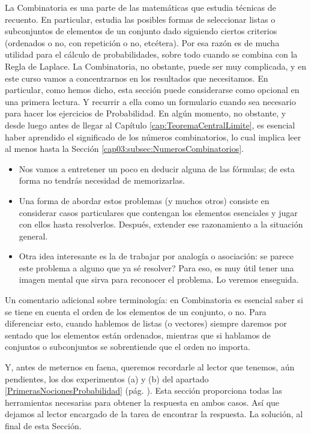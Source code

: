 La Combinatoria es una parte de las matemáticas que estudia técnicas de recuento. En particular, estudia las posibles formas de seleccionar listas o
subconjuntos de elementos de un conjunto dado siguiendo ciertos criterios (ordenados o no, con repetición o no, etcétera). Por esa razón es de mucha
utilidad para el cálculo de probabilidades, sobre todo cuando se combina con la Regla de Laplace. La Combinatoria, no obstante, puede ser muy
complicada, y en este curso vamos a concentrarnos en los resultados que necesitamos. En particular, como hemos dicho, esta sección puede considerarse como opcional en una primera lectura. Y recurrir a ella como un formulario cuando sea necesario para hacer los ejercicios de Probabilidad. En algún momento, no
obstante, y desde luego antes de llegar al Capítulo \ref{cap:TeoremaCentralLimite}, es esencial haber aprendido el significado de los números
combinatorios, lo cual implica leer al menos hasta la Sección \ref{cap03:subsec:NumerosCombinatorios}.

\begin{itemize}
\item Nos vamos a entretener un poco en deducir alguna de las fórmulas;
de esta forma no tendrás necesidad de memorizarlas.
\item Una forma de abordar estos problemas (y muchos otros) consiste
en considerar casos particulares que contengan los elementos esenciales
y jugar con ellos hasta resolverlos. Despu\'es, extender ese razonamiento a la situaci\'on general.
\item Otra idea interesante es la de trabajar por analog\'ia o asociaci\'on:
\textquestiondown se parece este problema a alguno que ya sé resolver? Para eso,
es muy \'util tener una imagen mental que sirva para reconocer el problema.
Lo veremos enseguida.
\end{itemize}

Un comentario adicional sobre terminología: en Combinatoria es esencial saber si se tiene en cuenta el orden de los elementos de un conjunto, o no.
Para diferenciar esto, cuando hablemos de {\sf listas (o vectores)} siempre daremos por sentado que los elementos están
ordenados, mientras que si hablamos de conjuntos o subconjuntos se sobrentiende que el orden no importa.

Y, antes de meternos en faena, queremos recordarle al lector que tenemos, aún pendientes, los dos experimentos (a) y (b) del apartado \ref{PrimerasNocionesProbabilidad} (pág. \pageref{PrimerasNocionesProbabilidad}). Esta sección proporciona todas las herramientas necesarias para obtener la respuesta en ambos casos. Así que dejamos al lector encargado de la tarea de encontrar la respuesta. La solución, al final de esta Sección.


